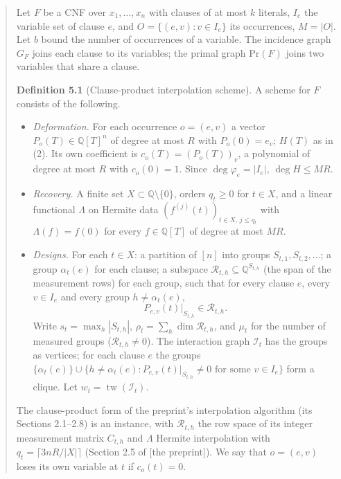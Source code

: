\documentclass[11pt,a4paper]{article}
\theoremstyle{definition}
\theoremstyle{remark}
\newcommand{\Q}{\mathbb{Q}}
\newcommand{\cR}{\mathcal{R}}
\newcommand{\cI}{\mathcal{I}}
\newcommand{\tw}{\operatorname{tw}}
\begin{document}
\begin{quote}
Let $F$ be a CNF over $x_1,\dots,x_n$ with clauses of at most $k$ literals, $I_e$ the variable
set of clause $e$, and $O=\{(e,v):v\in I_e\}$ its occurrences, $M=|O|$. Let $b$ bound the
number of occurrences of a variable. The incidence graph $G_F$ joins each clause to its
variables; the primal graph $\mathrm{Pr}(F)$ joins two variables that share a clause.

\textbf{Definition 5.1} (Clause-product interpolation scheme). A scheme for $F$ consists of
the following.
\begin{itemize}
\item[(a)] \emph{Deformation.} For each occurrence $o=(e,v)$ a vector $P_o(T)\in\Q[T]^n$ of
 degree at most $R$ with $P_o(0)=e_v$; $H(T)$ as in (2). Its own coefficient is
 $c_o(T)=(P_o(T))_v$, a polynomial of degree at most $R$ with $c_o(0)=1$. Since
 $\deg\varphi_e=|I_e|$, $\deg H\le MR$.
\item[(b)] \emph{Recovery.} A finite set $X\subset\Q\setminus\{0\}$, orders $q_t\ge0$ for
 $t\in X$, and a linear functional $\Lambda$ on Hermite data
 $(f^{(j)}(t))_{t\in X,\,j\le q_t}$ with $\Lambda(f)=f(0)$ for every $f\in\Q[T]$ of degree at
 most $MR$.
\item[(c)] \emph{Designs.} For each $t\in X$: a partition of $[n]$ into groups
 $S_{t,1},S_{t,2},\dots$; a group $\alpha_t(e)$ for each clause; a subspace
 $\cR_{t,h}\subseteq\Q^{S_{t,h}}$ (the span of the measurement rows) for each group, such
 that for every clause $e$, every $v\in I_e$ and every group $h\ne\alpha_t(e)$,
 \begin{equation}\tag{DL.3}\label{eq:three}
 P_{e,v}(t)\big|_{S_{t,h}}\in\cR_{t,h}.
 \end{equation}
 Write $s_t=\max_h|S_{t,h}|$, $\rho_t=\sum_h\dim\cR_{t,h}$, and $\mu_t$ for the number of
 measured groups ($\cR_{t,h}\neq0$). The interaction graph $\cI_t$ has the groups as
 vertices; for each clause $e$ the groups
 $\{\alpha_t(e)\}\cup\{h\ne\alpha_t(e):P_{e,v}(t)|_{S_{t,h}}\ne0\text{ for some }v\in I_e\}$
 form a clique. Let $w_t=\tw(\cI_t)$.
\end{itemize}
The clause-product form of the preprint's interpolation algorithm (its Sections 2.1--2.8) is
an instance, with $\cR_{t,h}$ the row space of its integer measurement matrix $C_{t,h}$ and
$\Lambda$ Hermite interpolation with $q_t=\lceil 3nR/|X|\rceil$ (Section 2.5 of [the
preprint]). We say that $o=(e,v)$ loses its own variable at $t$ if $c_o(t)=0$.
\end{quote}
\end{document}
